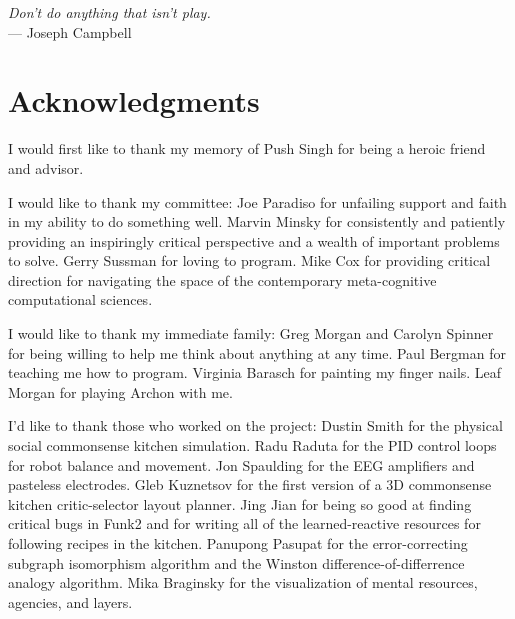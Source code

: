 



\begin{flushright}{\slshape    
Don't do anything that isn't play.} \\ \medskip
    --- Joseph Campbell
\end{flushright}



\bigskip

\begingroup
\let\clearpage\relax
\let\cleardoublepage\relax
\let\cleardoublepage\relax
\chapter*{Acknowledgments}

I would first like to thank my memory of Push Singh for being a heroic friend and advisor.

\vspace{5mm}

\noindent I would like to thank my committee:
Joe Paradiso for unfailing support and faith in my ability to do something well.
Marvin Minsky for consistently and patiently providing an inspiringly critical perspective and a wealth of important problems to solve.
Gerry Sussman for loving to program.
Mike Cox for providing critical direction for navigating the space of the contemporary meta-cognitive computational sciences.

\vspace{5mm}

\noindent I would like to thank my immediate family:
Greg Morgan and Carolyn Spinner for being willing to help me think about anything at any time.
Paul Bergman for teaching me how to program.
Virginia Barasch for painting my finger nails.
Leaf Morgan for playing Archon with me.

\vspace{5mm}

\noindent I'd like to thank those who worked on the project:
Dustin Smith for the physical social commonsense kitchen simulation.
Radu Raduta for the PID control loops for robot balance and movement.
Jon Spaulding for the EEG amplifiers and pasteless electrodes.
Gleb Kuznetsov for the first version of a 3D commonsense kitchen critic-selector layout planner.
Jing Jian for being so good at finding critical bugs in Funk2 and for writing all of the learned-reactive resources for following recipes in the kitchen.
Panupong Pasupat for the error-correcting subgraph isomorphism algorithm and the Winston difference-of-differrence analogy algorithm.
Mika Braginsky for the visualization of mental resources, agencies, and layers.

